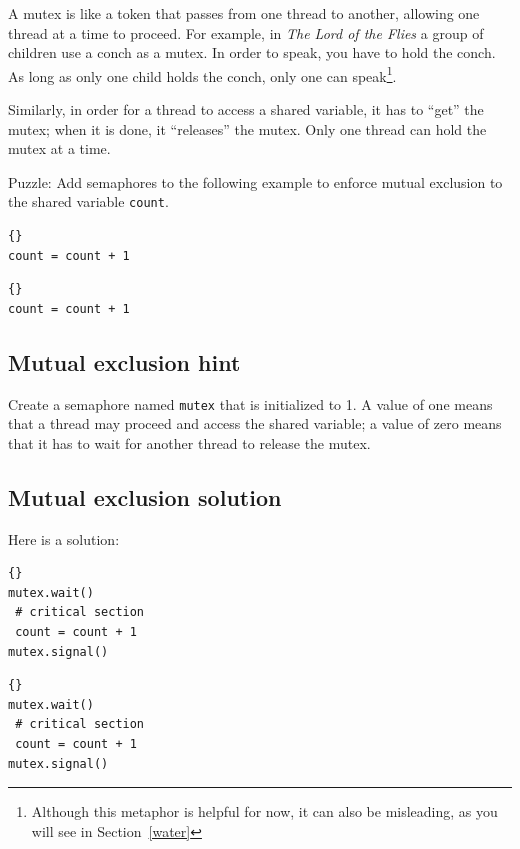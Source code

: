 \documentclass{book}
\begin{document}
A mutex is like a token that passes from one thread to another,
allowing one thread at a time to proceed.  For example, in {\em The
        Lord of the Flies} a group of children use a conch as a mutex.  In
order to speak, you have to hold the conch.  As long as only one child
holds the conch, only one can speak\footnote{Although this metaphor
    is helpful for now, it can also be misleading, as you will see in
    Section~\ref{water}}.

Similarly, in order for a thread to access a shared variable,
it has to ``get'' the mutex; when it is done, it ``releases''
the mutex.  Only one thread can hold the mutex at a time.

Puzzle: Add semaphores to the following example to
enforce mutual exclusion to the shared variable {\tt count}.

\begin{minipage}[t]{0.4\textwidth}
    \begin{lstlisting}[title={Thread A}]{}
count = count + 1
\end{lstlisting}
\end{minipage}
\hfill
\begin{minipage}[t]{0.4\textwidth}
    \begin{lstlisting}[title={Thread B}]{}
count = count + 1
\end{lstlisting}
\end{minipage}



\subsection{Mutual exclusion hint}

Create a semaphore named {\tt mutex} that is initialized
to 1.  A value of one means that a thread may proceed and
access the shared variable; a value of zero means that it
has to wait for another thread to release the mutex.



\subsection{Mutual exclusion solution}

Here is a solution:

\begin{minipage}[t]{0.42\textwidth}
    \begin{lstlisting}[basicstyle=\scriptsize,title={Thread A}]{}
mutex.wait()
 # critical section
 count = count + 1
mutex.signal()
\end{lstlisting}
\end{minipage}
\hfill
\begin{minipage}[t]{0.42\textwidth}
    \begin{lstlisting}[basicstyle=\scriptsize,title={Thread B}]{}
mutex.wait()
 # critical section
 count = count + 1
mutex.signal()
\end{lstlisting}
\end{minipage}
\end{document}
